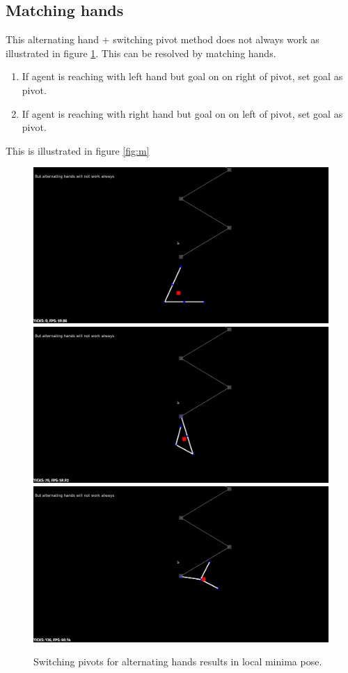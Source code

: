 \documentclass[12pt]{article}
\begin{document}
\subsection{Matching hands}
This alternating hand + switching pivot method does not always work as illustrated in figure \ref{fig:sf}.
This can be resolved by matching hands.
\begin{enumerate}[nolistsep]
    \item If agent is reaching with left hand but goal on on right of pivot, set goal as pivot.
    \item If agent is reaching with right hand but goal on on left of pivot, set goal as pivot.
\end{enumerate}
This is illustrated in figure \ref{fig:m}
\begin{figure}[!htb]
\includegraphics[width=\linewidth]{figures/sf1.jpg}
\endminipage\hfill
{}
\includegraphics[width=\linewidth]{figures/sf2.jpg}
\endminipage\hfill
{}%
\includegraphics[width=\linewidth]{figures/sf3.jpg}
\endminipage
\caption{Switching pivots for alternating hands results in local minima pose.}
\label{fig:sf}
\end{figure}
\end{document}
